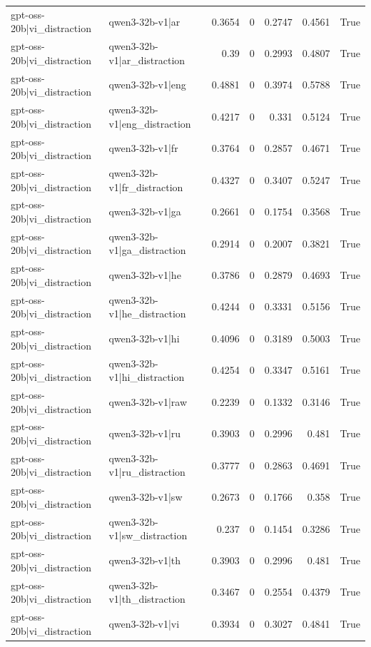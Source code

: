 \begin{table}
\begin{tabular}{l l r r r r l}
gpt-oss-20b|vi_distraction & qwen3-32b-v1|ar & 0.3654 & 0 & 0.2747 & 0.4561 & True \\
gpt-oss-20b|vi_distraction & qwen3-32b-v1|ar_distraction & 0.39 & 0 & 0.2993 & 0.4807 & True \\
gpt-oss-20b|vi_distraction & qwen3-32b-v1|eng & 0.4881 & 0 & 0.3974 & 0.5788 & True \\
gpt-oss-20b|vi_distraction & qwen3-32b-v1|eng_distraction & 0.4217 & 0 & 0.331 & 0.5124 & True \\
gpt-oss-20b|vi_distraction & qwen3-32b-v1|fr & 0.3764 & 0 & 0.2857 & 0.4671 & True \\
gpt-oss-20b|vi_distraction & qwen3-32b-v1|fr_distraction & 0.4327 & 0 & 0.3407 & 0.5247 & True \\
gpt-oss-20b|vi_distraction & qwen3-32b-v1|ga & 0.2661 & 0 & 0.1754 & 0.3568 & True \\
gpt-oss-20b|vi_distraction & qwen3-32b-v1|ga_distraction & 0.2914 & 0 & 0.2007 & 0.3821 & True \\
gpt-oss-20b|vi_distraction & qwen3-32b-v1|he & 0.3786 & 0 & 0.2879 & 0.4693 & True \\
gpt-oss-20b|vi_distraction & qwen3-32b-v1|he_distraction & 0.4244 & 0 & 0.3331 & 0.5156 & True \\
gpt-oss-20b|vi_distraction & qwen3-32b-v1|hi & 0.4096 & 0 & 0.3189 & 0.5003 & True \\
gpt-oss-20b|vi_distraction & qwen3-32b-v1|hi_distraction & 0.4254 & 0 & 0.3347 & 0.5161 & True \\
gpt-oss-20b|vi_distraction & qwen3-32b-v1|raw & 0.2239 & 0 & 0.1332 & 0.3146 & True \\
gpt-oss-20b|vi_distraction & qwen3-32b-v1|ru & 0.3903 & 0 & 0.2996 & 0.481 & True \\
gpt-oss-20b|vi_distraction & qwen3-32b-v1|ru_distraction & 0.3777 & 0 & 0.2863 & 0.4691 & True \\
gpt-oss-20b|vi_distraction & qwen3-32b-v1|sw & 0.2673 & 0 & 0.1766 & 0.358 & True \\
gpt-oss-20b|vi_distraction & qwen3-32b-v1|sw_distraction & 0.237 & 0 & 0.1454 & 0.3286 & True \\
gpt-oss-20b|vi_distraction & qwen3-32b-v1|th & 0.3903 & 0 & 0.2996 & 0.481 & True \\
gpt-oss-20b|vi_distraction & qwen3-32b-v1|th_distraction & 0.3467 & 0 & 0.2554 & 0.4379 & True \\
gpt-oss-20b|vi_distraction & qwen3-32b-v1|vi & 0.3934 & 0 & 0.3027 & 0.4841 & True \\

\end{tabular}
\end{table}
